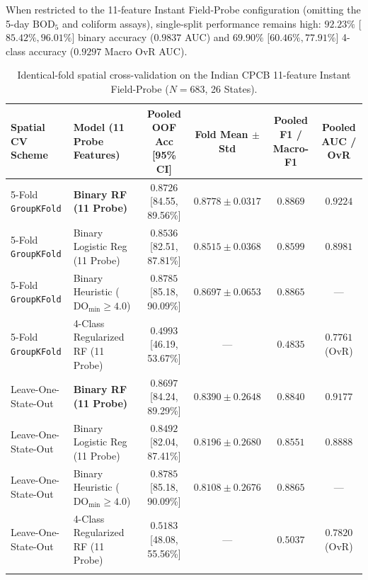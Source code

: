 \documentclass[pdflatex,sn-mathphys-num]{sn-jnl}%
\theoremstyle{thmstyleone}%
\theoremstyle{thmstyletwo}%
\theoremstyle{thmstylethree}%
\begin{document}
When restricted to the 11-feature Instant Field-Probe configuration (omitting the 5-day $\text{BOD}_5$ and coliform assays), single-split performance remains high: $92.23\%$ [$85.42\%, 96.01\%$] binary accuracy ($0.9837$ AUC) and $69.90\%$ [$60.46\%, 77.91\%$] 4-class accuracy ($0.9297$ Macro OvR AUC).

\begin{table}[t]
\caption{Identical-fold spatial cross-validation on the Indian CPCB 11-feature Instant Field-Probe ($N = 683$, 26 States).}\label{tab:cpcb_spatial}%
\tiny\setlength{\tabcolsep}{1.5pt}
\begin{tabular*}{\textwidth}{@{\extracolsep\fill}p{}p{}cccc@{}}
\toprule
Spatial CV Scheme & Model (11 Probe Features) & Pooled OOF Acc [95\% CI] & Fold Mean $\pm$ Std & Pooled F1 / Macro-F1 & Pooled AUC / OvR \\
\midrule
5-Fold \texttt{GroupKFold} & \textbf{Binary RF (11 Probe)} & $\mathbf{0.8726}$ [84.55, 89.56\%] & $0.8778 \pm 0.0317$ & $\mathbf{0.8869}$ & $\mathbf{0.9224}$ \\
5-Fold \texttt{GroupKFold} & Binary Logistic Reg (11 Probe) & $0.8536$ [82.51, 87.81\%] & $0.8515 \pm 0.0368$ & $0.8599$ & $0.8981$ \\
5-Fold \texttt{GroupKFold} & Binary Heuristic ($\text{DO}_{\min} \ge 4.0$) & $\mathbf{0.8785}$ [85.18, 90.09\%] & $0.8697 \pm 0.0653$ & $0.8865$ & --- \\
5-Fold \texttt{GroupKFold} & 4-Class Regularized RF (11 Probe) & $0.4993$ [46.19, 53.67\%] & --- & $0.4835$ & $0.7761$ (OvR) \\
\midrule
Leave-One-State-Out & \textbf{Binary RF (11 Probe)} & $\mathbf{0.8697}$ [84.24, 89.29\%] & $0.8390 \pm 0.2648$ & $\mathbf{0.8840}$ & $\mathbf{0.9177}$ \\
Leave-One-State-Out & Binary Logistic Reg (11 Probe) & $0.8492$ [82.04, 87.41\%] & $0.8196 \pm 0.2680$ & $0.8551$ & $0.8888$ \\
Leave-One-State-Out & Binary Heuristic ($\text{DO}_{\min} \ge 4.0$) & $\mathbf{0.8785}$ [85.18, 90.09\%] & $0.8108 \pm 0.2676$ & $0.8865$ & --- \\
Leave-One-State-Out & 4-Class Regularized RF (11 Probe) & $0.5183$ [48.08, 55.56\%] & --- & $0.5037$ & $0.7820$ (OvR) \\
\botrule
\end{tabular*}
\end{table}
\end{document}
